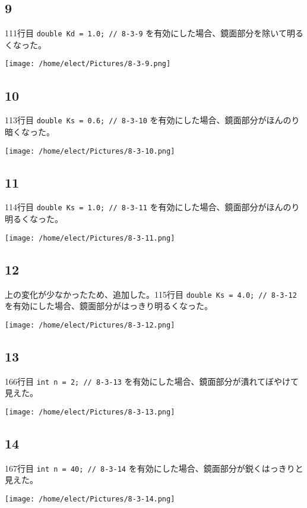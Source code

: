 \documentclass{scrartcl}
\begin{document}
\subsection{9}
\label{sec:orgb76d250}
111行目 \texttt{double Kd = 1.0;  // 8-3-9} を有効にした場合、鏡面部分を除いて明るくなった。\\
\begin{center}
\texttt{[image: /home/elect/Pictures/8-3-9.png]}
\end{center}
\subsection{10}
\label{sec:orge9424cc}
113行目 \texttt{double Ks = 0.6;  // 8-3-10} を有効にした場合、鏡面部分がほんのり暗くなった。\\
\begin{center}
\texttt{[image: /home/elect/Pictures/8-3-10.png]}
\end{center}
\subsection{11}
\label{sec:org49b7fb8}
114行目 \texttt{double Ks = 1.0;  // 8-3-11} を有効にした場合、鏡面部分がほんのり明るくなった。\\
\begin{center}
\texttt{[image: /home/elect/Pictures/8-3-11.png]}
\end{center}
\subsection{12}
\label{sec:org8063546}
上の変化が少なかったため、追加した。115行目 \texttt{double Ks = 4.0;  // 8-3-12} を有効にした場合、鏡面部分がはっきり明るくなった。\\
\begin{center}
\texttt{[image: /home/elect/Pictures/8-3-12.png]}
\end{center}
\subsection{13}
\label{sec:orgce57054}
166行目 \texttt{int n = 2; // 8-3-13} を有効にした場合、鏡面部分が潰れてぼやけて見えた。\\
\begin{center}
\texttt{[image: /home/elect/Pictures/8-3-13.png]}
\end{center}
\subsection{14}
\label{sec:org1e617ea}
167行目 \texttt{int n = 40; // 8-3-14} を有効にした場合、鏡面部分が鋭くはっきりと見えた。\\
\begin{center}
\texttt{[image: /home/elect/Pictures/8-3-14.png]}
\end{center}
\end{document}
